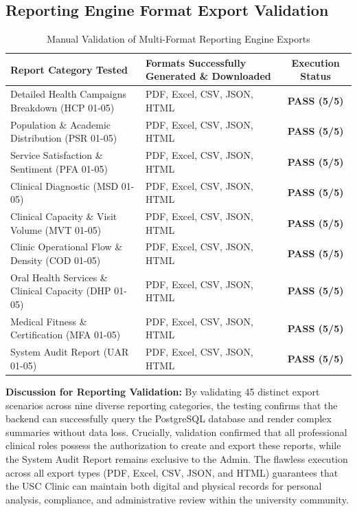 \subsection{Reporting Engine Format Export Validation}
\begin{table}[H]
\centering
\caption{Manual Validation of Multi-Format Reporting Engine Exports}
\begin{tabularx}{\textwidth}{|Y|Y|c|}
\hline
\textbf{Report Category Tested} & \textbf{Formats Successfully Generated \& Downloaded} & \textbf{Execution Status} \\
\hline
Detailed Health Campaigns Breakdown (HCP 01-05) & PDF, Excel, CSV, JSON, HTML & \textbf{PASS (5/5)} \\
\hline
Population \& Academic Distribution (PSR 01-05) & PDF, Excel, CSV, JSON, HTML & \textbf{PASS (5/5)} \\
\hline
Service Satisfaction \& Sentiment (PFA 01-05) & PDF, Excel, CSV, JSON, HTML & \textbf{PASS (5/5)} \\
\hline
Clinical Diagnostic (MSD 01-05) & PDF, Excel, CSV, JSON, HTML & \textbf{PASS (5/5)} \\
\hline
Clinical Capacity \& Visit Volume (MVT 01-05) & PDF, Excel, CSV, JSON, HTML & \textbf{PASS (5/5)} \\
\hline
Clinic Operational Flow \& Density (COD 01-05) & PDF, Excel, CSV, JSON, HTML & \textbf{PASS (5/5)} \\
\hline
Oral Health Services \& Clinical Capacity (DHP 01-05) & PDF, Excel, CSV, JSON, HTML & \textbf{PASS (5/5)} \\
\hline
Medical Fitness \& Certification (MFA 01-05) & PDF, Excel, CSV, JSON, HTML & \textbf{PASS (5/5)} \\
\hline
System Audit Report (UAR 01-05) & PDF, Excel, CSV, JSON, HTML & \textbf{PASS (5/5)} \\
\hline
\end{tabularx}
\end{table}

\textbf{Discussion for Reporting Validation:} By validating 45 distinct export scenarios across nine diverse reporting categories, the testing confirms that the backend can successfully query the PostgreSQL database and render complex summaries without data loss. Crucially, validation confirmed that all professional clinical roles possess the authorization to create and export these reports, while the System Audit Report remains exclusive to the Admin. The flawless execution across all export types (PDF, Excel, CSV, JSON, and HTML) guarantees that the USC Clinic can maintain both digital and physical records for personal analysis, compliance, and administrative review within the university community.
